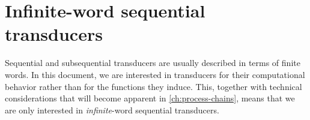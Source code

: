 


      


\section{Infinite-word sequential transducers}

Sequential and subsequential transducers\autocite{??} are usually described in terms of finite words.
In this document, we are interested in transducers for their computational behavior rather than for the functions they induce.
This, together with technical considerations that will become apparent in \cref{ch:process-chains}, means that we are only interested in \emph{infinite}-word sequential transducers.

